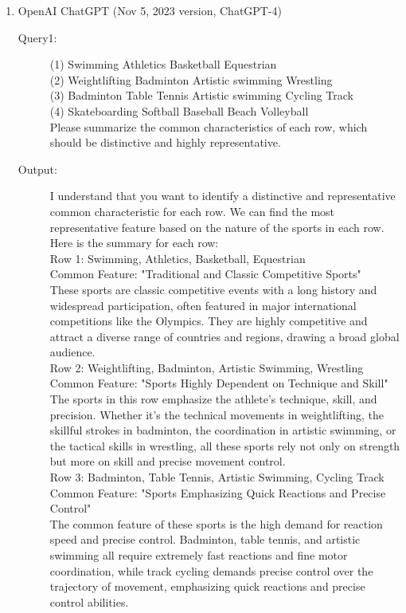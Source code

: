 \documentclass{mcmthesis}
\begin{document}
\begin{enumerate}
\item OpenAI ChatGPT (Nov 5, 2023 version, ChatGPT-4) 
\begin{description}
\item[Query1:] (1) Swimming Athletics Basketball Equestrian\\
(2) Weightlifting Badminton Artistic swimming Wrestling\\
(3) Badminton Table Tennis Artistic swimming Cycling Track\\
(4) Skateboarding Softball Baseball Beach Volleyball\\
Please summarize the common characteristics of each row, which should be distinctive and highly representative. 
\item[Output:] I understand that you want to identify a distinctive and representative common characteristic for each row. We can find the most representative feature based on the nature of the sports in each row. Here is the summary for each row:\\
Row 1: Swimming, Athletics, Basketball, Equestrian\\
Common Feature: "Traditional and Classic Competitive Sports"\\
These sports are classic competitive events with a long history and widespread participation, often featured in major international competitions like the Olympics. They are highly competitive and attract a diverse range of countries and regions, drawing a broad global audience.\\
Row 2: Weightlifting, Badminton, Artistic Swimming, Wrestling\\
Common Feature: "Sports Highly Dependent on Technique and Skill"\\
The sports in this row emphasize the athlete's technique, skill, and precision. Whether it's the technical movements in weightlifting, the skillful strokes in badminton, the coordination in artistic swimming, or the tactical skills in wrestling, all these sports rely not only on strength but more on skill and precise movement control.\\
Row 3: Badminton, Table Tennis, Artistic Swimming, Cycling Track\\
Common Feature: "Sports Emphasizing Quick Reactions and Precise Control"\\
The common feature of these sports is the high demand for reaction speed and precise control. Badminton, table tennis, and artistic swimming all require extremely fast reactions and fine motor coordination, while track cycling demands precise control over the trajectory of movement, emphasizing quick reactions and precise control abilities.\\

\end{description}
\end{enumerate}
\end{document}

